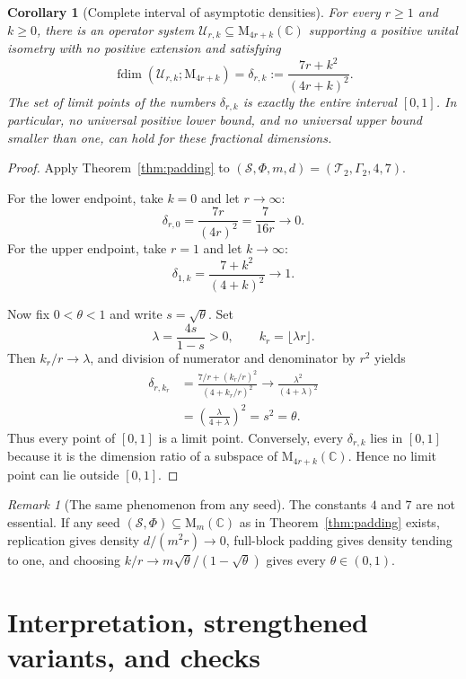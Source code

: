 \documentclass[11pt]{article}
\newtheorem{corollary}[theorem]{Corollary}
\theoremstyle{remark}
\newtheorem{remark}[theorem]{Remark}
\newcommand{\C}{\mathbb C}
\newcommand{\M}{\mathrm M}
\begin{document}
\begin{corollary}[Complete interval of asymptotic densities]\label{cor:interval}
For every $r\geq1$ and $k\geq0$, there is an operator system
$\mathcal U_{r,k}\subseteq\M_{4r+k}(\C)$ supporting a positive unital isometry with no positive extension and satisfying
\[
  \operatorname{fdim}(\mathcal U_{r,k};\M_{4r+k})
  =\delta_{r,k}:=\frac{7r+k^2}{(4r+k)^2}.
\]
The set of limit points of the numbers $\delta_{r,k}$ is exactly the entire interval $[0,1]$.  In particular, no universal positive lower bound, and no universal upper bound smaller than one, can hold for these fractional dimensions.
\end{corollary}

\begin{proof}
Apply Theorem~\ref{thm:padding} to $(\mathcal S,\Phi,m,d)=(\mathcal T_2,\Gamma_2,4,7)$.

For the lower endpoint, take $k=0$ and let $r\to\infty$:
\[
  \delta_{r,0}=\frac{7r}{(4r)^2}=\frac{7}{16r}\longrightarrow0.
\]
For the upper endpoint, take $r=1$ and let $k\to\infty$:
\[
  \delta_{1,k}=\frac{7+k^2}{(4+k)^2}\longrightarrow1.
\]

Now fix $0<\theta<1$ and write $s=\sqrt\theta$.  Set
\[
  \lambda=\frac{4s}{1-s}>0,
  \qquad k_r=\lfloor\lambda r\rfloor.
\]
Then $k_r/r\to\lambda$, and division of numerator and denominator by $r^2$ yields
\begin{align*}
 \delta_{r,k_r}
 &=\frac{7/r+(k_r/r)^2}{(4+k_r/r)^2}
 \longrightarrow \frac{\lambda^2}{(4+\lambda)^2}\\
 &=\left(\frac{\lambda}{4+\lambda}\right)^2
 =s^2=\theta.
\end{align*}
Thus every point of $[0,1]$ is a limit point.  Conversely, every $\delta_{r,k}$ lies in $[0,1]$ because it is the dimension ratio of a subspace of $\M_{4r+k}(\C)$.  Hence no limit point can lie outside $[0,1]$.
\end{proof}

\begin{remark}[The same phenomenon from any seed]
The constants $4$ and $7$ are not essential.  If any seed $(\mathcal S,\Phi)\subseteq\M_m(\C)$ as in Theorem~\ref{thm:padding} exists, replication gives density $d/(m^2r)\to0$, full-block padding gives density tending to one, and choosing $k/r\to m\sqrt\theta/(1-\sqrt\theta)$ gives every $\theta\in(0,1)$.
\end{remark}

\section{Interpretation, strengthened variants, and checks}
\end{document}
